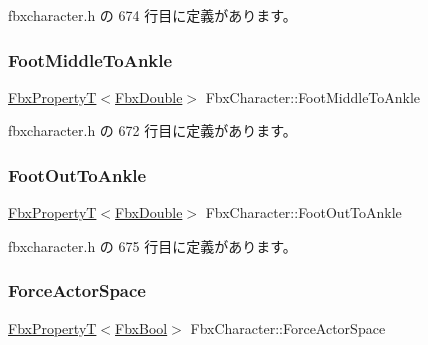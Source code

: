  fbxcharacter.\+h の 674 行目に定義があります。

\mbox{\label{class_fbx_character_aba466d9e9ca0f585126b3f9712b4d1d0}} 
\subsubsection{\texorpdfstring{Foot\+Middle\+To\+Ankle}{FootMiddleToAnkle}}
{\footnotesize\ttfamily \hyperlink{class_fbx_property_t}{Fbx\+PropertyT}$<$\hyperlink{fbxtypes_8h_a171e72a1c46fc15c1a6c9c31948c1c5b}{Fbx\+Double}$>$ Fbx\+Character\+::\+Foot\+Middle\+To\+Ankle}



 fbxcharacter.\+h の 672 行目に定義があります。

\mbox{\label{class_fbx_character_afd9ef7a16f7b7a80193e67c5e45a6d0b}} 
\subsubsection{\texorpdfstring{Foot\+Out\+To\+Ankle}{FootOutToAnkle}}
{\footnotesize\ttfamily \hyperlink{class_fbx_property_t}{Fbx\+PropertyT}$<$\hyperlink{fbxtypes_8h_a171e72a1c46fc15c1a6c9c31948c1c5b}{Fbx\+Double}$>$ Fbx\+Character\+::\+Foot\+Out\+To\+Ankle}



 fbxcharacter.\+h の 675 行目に定義があります。

\mbox{\label{class_fbx_character_a83c495dc866015af743d89e63aaa4d9c}} 
\subsubsection{\texorpdfstring{Force\+Actor\+Space}{ForceActorSpace}}
{\footnotesize\ttfamily \hyperlink{class_fbx_property_t}{Fbx\+PropertyT}$<$\hyperlink{fbxtypes_8h_a92e0562b2fe33e76a242f498b362262e}{Fbx\+Bool}$>$ Fbx\+Character\+::\+Force\+Actor\+Space}



